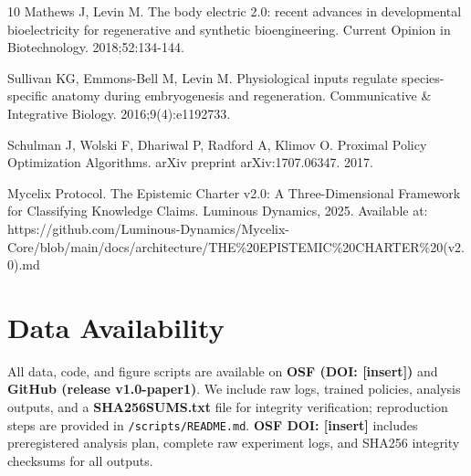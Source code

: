 \documentclass[10pt,letterpaper]{article}
\begin{document}
\begin{thebibliography}{10}
Mathews J, Levin M. The body electric 2.0: recent advances in developmental bioelectricity for regenerative and synthetic bioengineering. Current Opinion in Biotechnology. 2018;52:134-144.

Sullivan KG, Emmons-Bell M, Levin M. Physiological inputs regulate species-specific anatomy during embryogenesis and regeneration. Communicative \& Integrative Biology. 2016;9(4):e1192733.

Schulman J, Wolski F, Dhariwal P, Radford A, Klimov O. Proximal Policy Optimization Algorithms. arXiv preprint arXiv:1707.06347. 2017.

Mycelix Protocol. The Epistemic Charter v2.0: A Three-Dimensional Framework for Classifying Knowledge Claims. Luminous Dynamics, 2025. Available at: https://github.com/Luminous-Dynamics/Mycelix-Core/blob/main/docs/architecture/THE\%20EPISTEMIC\%20CHARTER\%20(v2.0).md

\end{thebibliography}

\section*{Data Availability}

All data, code, and figure scripts are available on \textbf{OSF (DOI: [insert])} and \textbf{GitHub (release v1.0-paper1)}. We include raw logs, trained policies, analysis outputs, and a \textbf{SHA256SUMS.txt} file for integrity verification; reproduction steps are provided in \texttt{/scripts/README.md}. \textbf{OSF DOI: [insert]} includes preregistered analysis plan, complete raw experiment logs, and SHA256 integrity checksums for all outputs.
\end{document}
